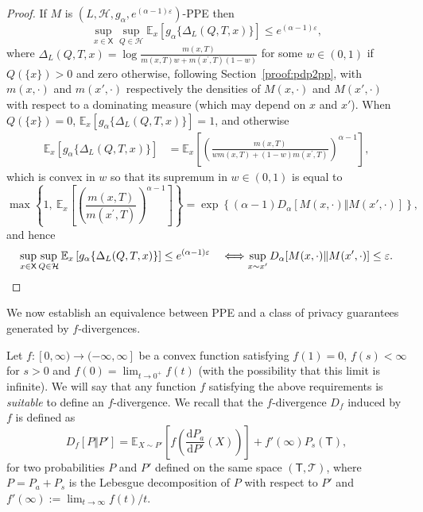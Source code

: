 \documentclass{article}
\theoremstyle{plain}
\theoremstyle{plain}
\theoremstyle{definition}
\theoremstyle{remark}
\theoremstyle{plain}
\newcommand{\rmd}{\mathrm{d}}
\newcommand{\ExMx}{\mathbb{E}_{x}}
\newcommand{\xset}{\mathsf{X}}
\renewcommand{\epsilon}{\varepsilon}
\begin{document}
\begin{proof}
    If $M$ is $(L,\mathcal{H},g_\alpha,e^{(\alpha-1)\epsilon})$-PPE then 
    \begin{equation}\label{eq:PPE-Renyi}
        \sup_{x \in \xset}\sup_{Q \in \mathcal H}\ExMx\left[g_\alpha\{\Delta_L(Q,T,x)\}\right] \leq e^{(\alpha-1)\epsilon},
    \end{equation}
where $\Delta_L(Q,T,x) = \log\frac{m(x,T)}{m(x,T)w + m(x^\prime, T)(1-w)}$ for some $w \in (0,1)$ if $Q(\{x\}) > 0$ and zero otherwise, following Section~\ref{proof:pdp2pp}, with $m(x,\cdot)$ and $m(x',\cdot) $ respectively the densities of $M(x,\cdot)$ and $M(x', \cdot)$ with respect to a dominating measure (which may depend on $x$ and $x'$). When $Q(\{x\}) = 0$, $\ExMx [g_\alpha\{\Delta_L(Q,T,x)\}] = 1$, and otherwise 
\begin{align*}
    \ExMx [g_\alpha\{\Delta_L(Q,T,x)\}]
    &= \ExMx \left[ \left(\frac{ m(x,T) }{ w m(x,T) + (1-w)m(x^\prime,T) } \right)^{\alpha-1} \right],
\end{align*}
which is convex in $w$ so that its supremum in $w \in (0,1)$ is equal to 
\begin{equation*}
    \max\left\{ 1,\ \ExMx \left[  \left(\frac{ m(x,T) }{ m(x^\prime,T) } \right)^{\alpha-1} \right]\right\} = \exp\left\{(\alpha-1) D_\alpha[ M(x, \cdot) \Vert M(x', \cdot ) ]\right\},
\end{equation*}
 and hence
 \begin{equation*}
     \sup_{x\in\mathsf{X}} \sup_{Q\in\mathcal{H}} \ExMx\left[ g_\alpha\{ \Delta_L(Q,T,x)\}  \right]\leq e^{(\alpha-1)\epsilon} \quad \Longleftrightarrow \sup_{x\sim x'} D_\alpha[ M(x, \cdot) \Vert M(x', \cdot ) ] \leq \epsilon.\qedhere
 \end{equation*}
\end{proof}

We now establish an equivalence between PPE and a class of privacy guarantees generated by $f$-divergences.

Let $f:[0,\infty) \rightarrow ( -\infty, \infty]$ be a convex function satisfying $f(1)=0$, $f(s) < \infty$ for $s > 0$ and $f(0) = \lim_{t\rightarrow 0^+} f(t)$ (with the possibility that this limit is infinite). We will say that any function $f$ satisfying the above requirements is \textit{suitable} to define an $f$-divergence. We recall that the $f$-divergence $D_f$ induced by $f$ is defined as 
\begin{equation} \label{f-div}
    D_f[P\Vert P'] = \mathbb E_{X \sim P'}\left[ f\left(\frac{ \rmd P_a}{\rmd P'} (X) \right)\right] + f'(\infty)P_s(\mathsf T),
\end{equation}
for two probabilities $P$ and $P'$ defined on the same space $(\mathsf{T},\mathcal{T})$, where $P = P_a + P_s$ is the Lebesgue decomposition of $P$ with respect to $P'$ and $f'(\infty):= \lim_{t \to \infty} f(t)/t$.
 
\end{document}
